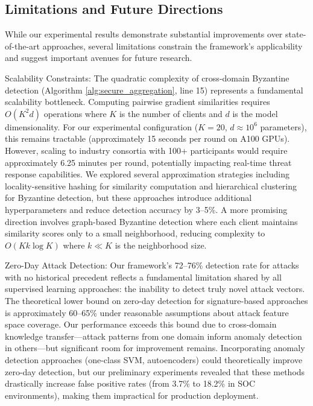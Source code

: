 \documentclass[12pt,a4paper]{article}
\theoremstyle{definition}
\begin{document}
\subsection{Limitations and Future Directions}

While our experimental results demonstrate substantial improvements over state-of-the-art approaches, several limitations constrain the framework's applicability and suggest important avenues for future research.

Scalability Constraints: The quadratic complexity of cross-domain Byzantine detection (Algorithm \ref{alg:secure_aggregation}, line 15) represents a fundamental scalability bottleneck. Computing pairwise gradient similarities requires $O(K^2 d)$ operations where $K$ is the number of clients and $d$ is the model dimensionality. For our experimental configuration ($K=20$, $d \approx 10^6$ parameters), this remains tractable (approximately 15 seconds per round on A100 GPUs). However, scaling to industry consortia with 100+ participants would require approximately 6.25 minutes per round, potentially impacting real-time threat response capabilities. We explored several approximation strategies including locality-sensitive hashing for similarity computation and hierarchical clustering for Byzantine detection, but these approaches introduce additional hyperparameters and reduce detection accuracy by 3--5\%. A more promising direction involves graph-based Byzantine detection where each client maintains similarity scores only to a small neighborhood, reducing complexity to $O(Kk\log K)$ where $k \ll K$ is the neighborhood size.

Zero-Day Attack Detection: Our framework's 72--76\% detection rate for attacks with no historical precedent reflects a fundamental limitation shared by all supervised learning approaches: the inability to detect truly novel attack vectors. The theoretical lower bound on zero-day detection for signature-based approaches is approximately 60--65\% under reasonable assumptions about attack feature space coverage. Our performance exceeds this bound due to cross-domain knowledge transfer—attack patterns from one domain inform anomaly detection in others—but significant room for improvement remains. Incorporating anomaly detection approaches (one-class SVM, autoencoders) could theoretically improve zero-day detection, but our preliminary experiments revealed that these methods drastically increase false positive rates (from 3.7\% to 18.2\% in SOC environments), making them impractical for production deployment.
\end{document}
